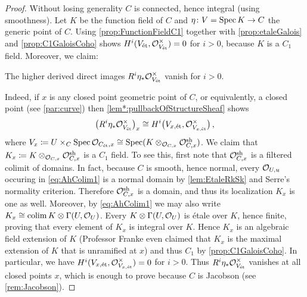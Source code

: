 \begin{proof}
	Without losing generality $C$ is connected, hence integral (using smoothness). Let $K$ be the function field of $C$ and $\eta\colon V=\Spec K\morphism C$ the generic point of $C$. Using \cref{prop:FunctionFieldC1} together with \cref{prop:etaleGalois} and \cref{prop:C1GaloisCoho} shows $H^i(V_{\mathrm{\acute{e}t}},\mathcal{O}_{V_{\mathrm{\acute{e}t}}}^\times)=0$ for $i>0$, because $K$ is a $C_1$ field. Moreover, we claim:
	\begin{alphanumerate}
		\item[\itememph{*}] The higher derived direct images $R^i\eta_*\mathcal{O}_{V_{\mathrm{\acute{e}t}}}^\times$ vanish for $i>0$.
	\end{alphanumerate}
	 Indeed, if $x$ is any closed point geometric point of $C$, or equivalently, a closed point (see \cref{par:curve}) then \cref{lem*:pullbackOfStructureSheaf} shows
	\begin{equation*}
		\big(R^i\eta_*\mathcal{O}_{V_{\mathrm{\acute{e}t}}}^\times\big)_x\cong H^i\big(V_{x,\mathrm{\acute{e}t}},\mathcal{O}_{V_{x,\mathrm{\acute{e}t}}}^\times\big)\,,
	\end{equation*}
	where $V_x\coloneqq U\times_C\operatorname{Spec} \mathcal{O}_{C_{\mathrm{\acute{e}t}},x}\cong \operatorname{Spec} (K\otimes_{\mathcal{O}_{C,x}} \mathcal{O}_{C,x}^{\mathrm{sh}})$. We claim that $K_x\coloneqq K\otimes_{\mathcal{O}_{C,x}} \mathcal{O}_{C,x}^{\mathrm{sh}}$ is a $C_1$ field. To see this, first note that $\mathcal{O}_{C,x}^{\mathrm{sh}}$ is a filtered colimit of domains. In fact, because $C$ is smooth, hence normal, every $\mathcal{O}_{U,u}$ occuring in \cref{eq:AhColim1} is a normal domain by \cref{lem:EtaleRkSk} and Serre's normality criterion. Therefore $\mathcal{O}_{C,x}^{\mathrm{sh}}$ is a domain, and thus its localization $K_x$ is one as well. Moreover, by \cref{eq:AhColim1} we may also write $K_x\cong \operatorname*{colim} K\otimes \operatorname{\Gamma}(U,\mathcal{O}_U)$. Every $K\otimes \operatorname{\Gamma}(U,\mathcal{O}_U)$ is étale over $K$, hence finite, proving that every element of $K_x$ is integral over $K$. Hence $K_x$ is an algebraic field extension of $K$ (Professor Franke even claimed that $K_x$ is the maximal extension of $K$ that is unramified at $x$) and thus $C_1$ by \cref{prop:C1GaloisCoho}. In particular, we have $H^i(V_{x,\mathrm{\acute{e}t}},\mathcal{O}_{V_{x,\mathrm{\acute{e}t}}}^\times)=0$ for $i>0$. Thus $R^i\eta_*\mathcal{O}_{V_{\mathrm{\acute{e}t}}}^\times$ vanishes at all closed points $x$, which is enough to prove \itememph{*} because $C$ is Jacobson (see \cref{rem:Jacobson}).
	

\end{proof}
